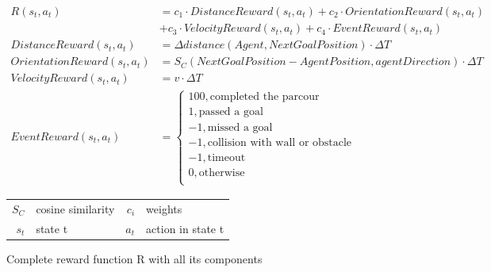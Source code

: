 \begin{figure}
    \centering
    \begin{align}
         R(s_t,a_t) &= c_1 \cdot DistanceReward(s_t,a_t) + c_2 \cdot OrientationReward(s_t,a_t) \nonumber \\
         &  + c_3 \cdot VelocityReward(s_t, a_t) + c_4 \cdot EventReward(s_t, a_t) \nonumber \\
         DistanceReward(s_t,a_t) &= \Delta distance(Agent, NextGoalPosition) \cdot \Delta T \nonumber \\
         OrientationReward(s_t,a_t) &= S_C(NextGoalPosition - AgentPosition, agentDirection) \cdot \Delta T \nonumber \\
         VelocityReward(s_t, a_t) &= v \cdot \Delta T \nonumber \\
         EventReward(s_t, a_t) &= \begin{cases}
              100,           \text{completed the parcour}           \\
              1,             \text{passed a goal}                   \\
              -1,            \text{missed a goal}                   \\
              -1,            \text{collision with wall or obstacle} \\
              -1,            \text{timeout}                         \\
              0,             \text{otherwise}                       \\
         \end{cases} \nonumber
    \end{align}
    \caption{Complete reward function R with all its components}
    \begin{tabular}{r@{: }l r@{: }l}
    $S_C$ & cosine similarity & $c_i$ & weights\\
    $s_t$& state t & $a_t$& action in state t 
    \end{tabular}
    \label{fig:reward_functions}
\end{figure}





